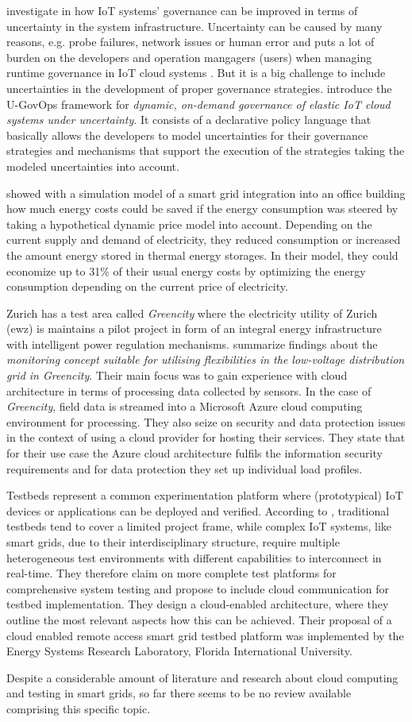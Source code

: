 \citeauthor{7396147} investigate in how IoT systems' governance can be improved in terms of uncertainty in the system infrastructure. Uncertainty can be caused by many reasons, e.g. probe failures, network issues or human error and puts a lot of burden on the developers and operation mangagers (users) when managing runtime governance in IoT cloud systems \cite{7396147}. But it is a big challenge to include uncertainties in the development of proper governance strategies. \citeauthor{7396147} introduce the U-GovOps framework for \textit{dynamic, on-demand governance of elastic IoT cloud systems under uncertainty}. It consists of a declarative policy language that basically allows the developers to model uncertainties for their governance strategies and mechanisms that support the execution of the strategies taking the modeled uncertainties into account.

\citeauthor{bornhoft2013simulation} showed with a simulation model of a smart grid integration into an office building how much energy costs could be saved if the energy consumption was steered by taking a hypothetical dynamic price model into account. Depending on the current supply and demand of electricity, they reduced consumption or increased the amount energy stored in thermal energy storages. In their model, they could economize up to 31\% of their usual energy costs by optimizing the energy consumption depending on the current price of electricity.

Zurich has a test area called \textit{Greencity} where the electricity utility of Zurich (ewz) is maintains a pilot project in form of an integral energy infrastructure with intelligent power regulation mechanisms. \citeauthor{baumgartner2020monitoring} summarize findings about the \textit{monitoring concept suitable for utilising flexibilities in the low-voltage distribution grid in Greencity}. Their main focus was to gain experience with cloud architecture in terms of processing data collected by sensors. In the case of \textit{Greencity}, field data is streamed into a Microsoft Azure cloud computing environment for processing. They also seize on security and data protection issues in the context of using a cloud provider for hosting their services. They state that for their use case the Azure cloud architecture fulfils the information security requirements and for data protection they set up individual load profiles.

Testbeds represent a common experimentation platform where (prototypical) IoT devices or applications can be deployed and verified. According to \citeauthor{cintuglu2016cloud}, traditional testbeds tend to cover a limited project frame, while complex IoT systems, like smart grids, due to their interdisciplinary structure, require multiple heterogeneous test environments with different capabilities to interconnect in real-time. They therefore claim on more complete test platforms for comprehensive system testing and propose to include cloud communication for testbed implementation. They design a cloud-enabled architecture, where they outline the most relevant aspects how this can be achieved. Their proposal of a cloud enabled remote access smart grid testbed platform was implemented by the Energy Systems Research Laboratory, Florida International University.

Despite a considerable amount of literature and research about cloud computing and testing in smart grids, so far there seems to be no review available comprising this specific topic.

